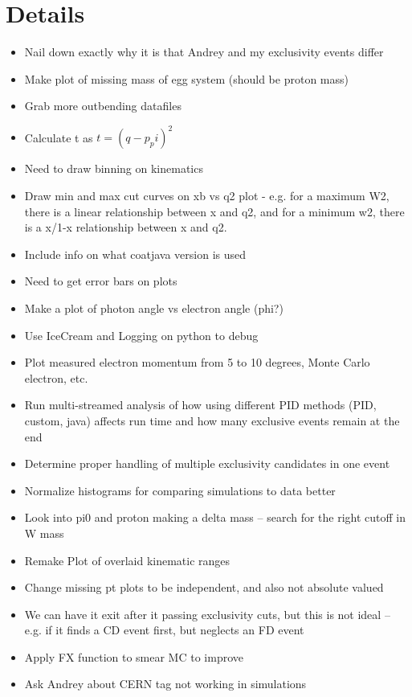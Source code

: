 \section{Details}
\begin{itemize}
    \item Nail down exactly why it is that Andrey and my exclusivity events differ
    \item Make plot of missing mass of egg system (should be proton mass)
    \item Grab more outbending datafiles
    \item Calculate t as $t = (q-p_pi)^2$
    \item Need to draw binning on kinematics
    \item Draw min and max cut curves on xb vs q2 plot - e.g. for a maximum W2, there is a linear relationship between x and q2, and for a minimum w2, there is a x/1-x relationship between x and q2.
    \item Include info on what coatjava version is used
    \item Need to get error bars on plots
    \item Make a plot of photon angle vs electron angle (phi?)
    \item Use IceCream and Logging on python to debug
    \item Plot measured electron momentum from 5 to 10 degrees, Monte Carlo electron, etc.
    \item Run multi-streamed analysis of how using different PID methods (PID, custom, java) affects run time and how many exclusive events remain at the end
    \item Determine proper handling of multiple exclusivity candidates in one event
    \item Normalize histograms for comparing simulations to data better
    \item Look into pi0 and proton making a delta mass – search for the right cutoff in W mass
    \item Remake Plot of overlaid kinematic ranges
    \item Change missing pt plots to be independent, and also not absolute valued
    \item We can have it exit after it passing exclusivity cuts, but this is not ideal – e.g. if it finds a CD event first, but neglects an FD event
    \item Apply FX function to smear MC to improve
    \item Ask Andrey about CERN tag not working in simulations

\end{itemize}
